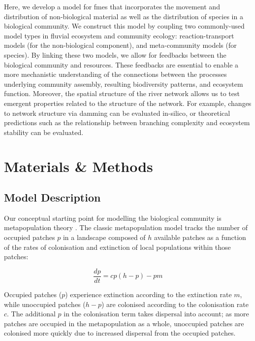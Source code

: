 \documentclass[11pt,a4paper]{article}
\begin{document}
Here, we develop a model for \acp{fme} that incorporates the movement and distribution of non-biological material as well as the distribution of species in a biological community.
We construct this model by coupling two commonly-used model types in fluvial ecosystem and community ecology: reaction-transport models (for the non-biological component), and meta-community models (for species).
By linking these two models, we allow for feedbacks between the biological community and resources.
These feedbacks are essential to enable a more mechanistic understanding of the connections between the processes underlying community assembly, resulting biodiversity patterns, and ecosystem function.
Moreover, the spatial structure of the river network allows us to test emergent properties related to the structure of the network.
For example, changes to network structure via damming can be evaluated in-silico, or theoretical predictions such as the relationship between branching complexity and ecosystem stability \autocite{Terui2018} can be evaluated.

\section{Materials \& Methods}

\subsection{Model Description}

Our conceptual starting point for modelling the biological community is metapopulation theory \autocite{Levins1969}.
The classic metapopulation model tracks the number of occupied patches $p$ in a landscape composed of $h$ available patches as a function of the rates of colonisation and extinction of local populations within those patches:

\begin{equation}
	\frac{dp}{dt} = cp \left( h - p \right) - pm \label{eq:levins}
\end{equation}

Occupied patches ($p$) experience extinction according to the extinction rate $m$, while unoccupied patches ($h-p$) are colonised according to the colonisation rate $c$. 
The additional $p$ in the colonisation term takes dispersal into account; as more patches are occupied in the metapopulation as a whole, unoccupied patches are colonised more quickly due to increased dispersal from the occupied patches.
\end{document}
